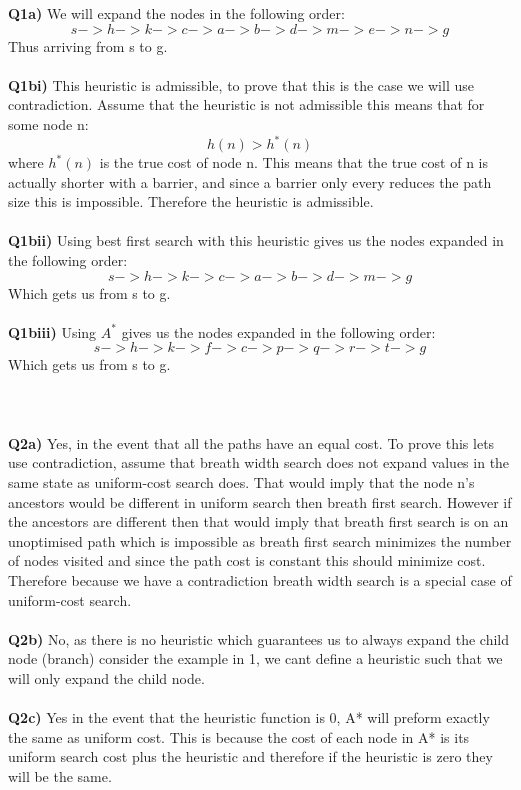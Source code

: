 \documentclass{article}
\begin{document}
\begin{titlepage}
\vspace{0.5cm}
\textbf{Q1a)} We will expand the nodes in the following order:
\[ s -> h -> k -> c -> a -> b -> d -> m -> e -> n -> g \]
Thus arriving from s to g.\\\\
\textbf{Q1bi)} This heuristic is admissible, to prove that this is the case we will use contradiction. Assume that the heuristic is not admissible this means that for some node n:
\[ h(n) > h^*(n) \]
where $h^*(n)$ is the true cost of node n. This means that the true cost of n is actually shorter with a barrier, and since a barrier only every reduces the path size this is impossible. Therefore the heuristic is admissible. \\\\
\textbf{Q1bii)} Using best first search with this heuristic gives us the nodes expanded in the following order: \\
\[ s -> h -> k -> c -> a -> b -> d -> m -> g \]
Which gets us from s to g. \\\\
\textbf{Q1biii)} Using $A^*$ gives us the nodes expanded in the following order:  \\
\[ s -> h -> k -> f -> c -> p -> q -> r -> t -> g \]
Which gets us from s to g.\\\\\\\\
\textbf{Q2a)} Yes, in the event that all the paths have an equal cost. To prove this lets use contradiction, assume that breath width search does not expand values in the same state as uniform-cost  search does. That would imply that the node n's ancestors would be different in uniform search then breath first search. However if the ancestors are different then that would imply that breath first search is on an unoptimised path which is impossible as breath first search minimizes the number of nodes visited and since the path cost is constant this should minimize cost. Therefore because we have a contradiction breath width search is a special case of uniform-cost search.\\\\
\textbf{Q2b)} No, as there is no heuristic which guarantees us to always expand the child node (branch) consider the example in 1, we cant define a heuristic such that we will only expand the child node. \\\\
\textbf{Q2c)} Yes in the event that the heuristic function is 0, A* will preform exactly the same as uniform cost. This is because the cost of each node in A* is its uniform search cost plus the heuristic and therefore if the heuristic is zero they will be the same. 

\end{titlepage}
\end{document}
